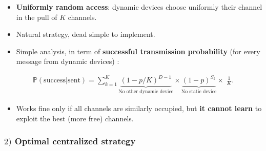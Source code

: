 \begin{frameO}

    \begin{itemize}
        \item
              \textbf{Uniformly random access}: dynamic devices choose uniformly
              their channel in the pull of \(K\) channels.
        \item
              Natural strategy, dead simple to implement.
    \end{itemize}

    \pause

    \begin{itemize}
        \item
            Simple analysis, in term of \textbf{successful transmission
            probability}\newline
            (for every message from dynamic devices) :
    \end{itemize}

    \begin{small} \begin{align*}
            \mathbb{P}(\text{success}|\text{sent}) = \sum_{k=1}^{K} \underbrace{(1 - p / K)^{D-1}}_{\text{No other dynamic device}} \times \underbrace{(1-p)^{S_k}}_{\text{No static device}} \times\; \frac{1}{K}.
        \end{align*} \end{small}

    \pause

    \begin{itemize}
        \item
              Works fine only if all channels are similarly occupied,\newline
              but \textbf{it cannot learn} to exploit the best (more free)
              channels.
    \end{itemize}

\end{frameO}



\subsubsection{$2)$ Optimal centralized strategy}


